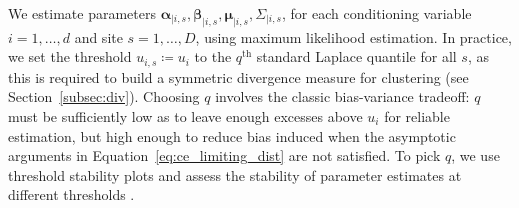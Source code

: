 \documentclass[12pt,compact]{article}
\begin{document}
We estimate parameters $\symbf{\alpha}_{\mid i, s}, \symbf{\beta}_{\mid i, s}, \symbf{\mu}_{\mid i, s}, \Sigma_{\mid i, s}$, for each conditioning variable $i = 1, \ldots, d$ and site $s = 1, \ldots, D$, using maximum likelihood estimation. %
In practice, we set the threshold $u_{i, s} \coloneqq u_i$ to the $q^{\text{th}}$ standard Laplace quantile for all $s$, as this is required to build a symmetric divergence measure for clustering (see Section~\ref{subsec:div}).
Choosing $q$ involves the classic bias-variance tradeoff: $q$ must be sufficiently low as to leave enough excesses above $u_i$ for reliable estimation, but high enough to reduce bias induced when the asymptotic arguments in Equation~\eqref{eq:ce_limiting_dist} are not satisfied. 
To pick $q$, we use threshold stability plots and assess the stability of parameter estimates at different thresholds \citep{Southworth2012}. %
\end{document}
